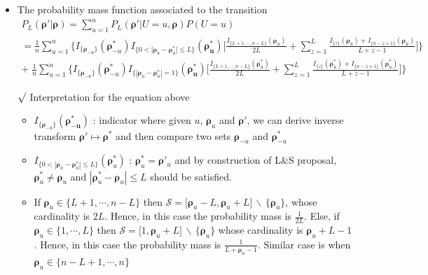 \documentclass[12pt]{article}
\newcommand{\rmk}{$\surd$}
\newcommand{\diff}{\,\backslash\,}
\begin{document}
\begin{itemize}
\begin{itemize}
        \item The probability mass function associated to the transition
        \begin{multline*}
            P_L(\boldsymbol{\rho}'|\boldsymbol{\rho}) = \sum_{u=1}^n P_L(\boldsymbol{\rho}'|U=u, \boldsymbol{\rho})P(U=u) \\ = \frac{1}{n}\sum_{u=1}^n\bigg\{I_{\{\boldsymbol{\rho}_{-u}\}}(\boldsymbol{\rho}_{-u}^*)I_{\{0<|\boldsymbol{\rho}_u-\boldsymbol{\rho}_u^*|\leq L\}}(\boldsymbol{\rho_u^*}) \Big[\frac{I_{\{L+1,\cdots, n-L\}}(\boldsymbol{\rho}_u)}{2L}+\sum_{z=1}^L \frac{I_{\{z\}}(\boldsymbol{\rho}_u)+I_{\{n-z+1\}}(\boldsymbol{\rho}_u)}{L+z-1} \Big]\bigg\} \\ +\; \frac{1}{n}\sum_{u=1}^n\bigg\{I_{\{\boldsymbol{\rho}_{-u}\}}(\boldsymbol{\rho}_{-u}^*)I_{\{|\boldsymbol{\rho}_u-\boldsymbol{\rho}_u^*|=1\}}(\boldsymbol{\rho_u^*}) \Big[\frac{I_{\{L+1,\cdots, n-L\}}(\boldsymbol{\rho}_u^*)}{2L}+\sum_{z=1}^L \frac{I_{\{z\}}(\boldsymbol{\rho}_u^*)+I_{\{n-z+1\}}(\boldsymbol{\rho}_u^*)}{L+z-1} \Big]\bigg\}
        \end{multline*}
        \item[\rmk] Interpretation for the equation above
        \begin{itemize}
            \item $ I_{\{\boldsymbol{\rho}_{-u}\}}(\boldsymbol{\rho_{-u}^*}) $ : indicator where given $u, \,\boldsymbol{\rho}_u$ and $\boldsymbol{\rho}'$, we can derive inverse transform $\boldsymbol{\rho}'\mapsto \boldsymbol{\rho}^*$ and then compare two sets $\boldsymbol{\rho}_{-u}$ and $\boldsymbol{\rho}_{-u}^*$
            \item $I_{\{0<|\boldsymbol{\rho}_u-\boldsymbol{\rho}_u^*|\leq L\}}(\boldsymbol{\rho}_u^*)$ : $\boldsymbol{\rho}_u^*=\boldsymbol{\rho}'_u$ and by construction of L\&S proposal, $\boldsymbol{\rho}_u^*\neq \boldsymbol{\rho}_u$ and $|\boldsymbol{\rho}_u^*-\boldsymbol{\rho}_u|\leq L$ should be satisfied. 
            \item If $\boldsymbol{\rho}_u\in \{L+1, \cdots, n-L\}$ then $\mathcal{S}=\big[\boldsymbol{\rho}_u-L, \boldsymbol{\rho}_u+L\big]\diff\{\boldsymbol{\rho}_u\}$, whose cardinality is $2L$. Hence, in this case the probability mass is $\frac{1}{2L}$. Else, if $\boldsymbol{\rho}_u\in \{1, \cdots, L\}$ then $\mathcal{S}=\big[1, \boldsymbol{\rho}_u+L\big]\diff\{\boldsymbol{\rho}_u\}$ whose cardinality is $\boldsymbol{\rho}_u+L-1$. Hence, in this case the probability mass is $\frac{1}{L+\boldsymbol{\rho}_u-1}$. Similar case is when $\boldsymbol{\rho}_u\in \{n-L+1, \cdots, n\}$ 

\end{itemize}
\end{itemize}
\end{itemize}
\end{document}
